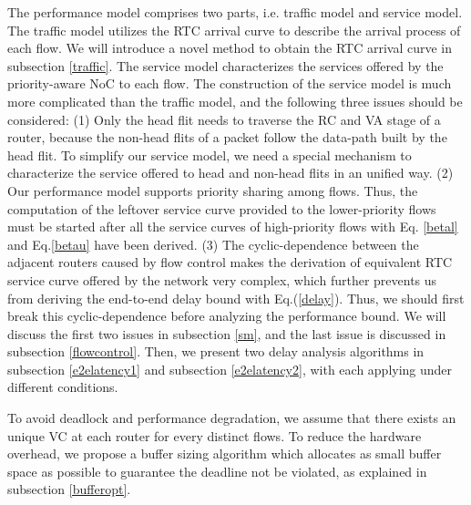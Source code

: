 \documentclass[preprint]{elsarticle}
\begin{document}
The performance model comprises two parts, i.e. traffic model and service model. The traffic model utilizes the RTC arrival curve to describe the arrival process of each flow. We will introduce a novel method to obtain the RTC arrival curve in subsection \ref{traffic}. The service model characterizes the services offered by the priority-aware NoC to each flow. The construction of the service model is much more complicated than the traffic model, and the following three issues should be considered: (1) Only the head flit needs to traverse the RC and VA stage of a router, because the non-head flits of a packet follow the data-path built by the head flit. To simplify our service model, we need a special mechanism to characterize the service offered to head and non-head flits in an unified way. (2) Our performance model supports priority sharing among flows. Thus, the computation of the leftover service curve provided to the lower-priority flows must be started after all the service curves of high-priority flows with Eq. \ref{betal} and Eq.\ref{betau} have been derived. (3) The cyclic-dependence between the adjacent routers caused by flow control makes the derivation of equivalent RTC service curve offered by the network very complex, which further prevents us from deriving the end-to-end delay bound with Eq.(\ref{delay}). Thus, we should first break this cyclic-dependence before analyzing the performance bound. We will discuss the first two issues in subsection \ref{sm}, and the last issue is discussed in subsection \ref{flowcontrol}. Then, we present two delay analysis algorithms in subsection \ref{e2elatency1} and subsection \ref{e2elatency2}, with each applying under different conditions.

To avoid deadlock and performance degradation, we assume that there exists an unique VC at each router for every distinct flows. To reduce the hardware overhead, we propose a buffer sizing algorithm which allocates as small buffer space as possible to guarantee the deadline not be violated, as explained in subsection \ref{bufferopt}.
\end{document}
